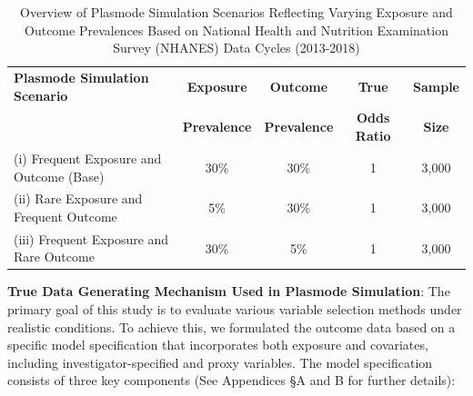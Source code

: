 \documentclass[sn-vancouver,Numbered,lineno,pdflatex]{sn-jnl}
\begin{document}
\begin{table}[ht]
\centering
\caption{Overview of Plasmode Simulation Scenarios Reflecting Varying Exposure and Outcome Prevalences Based on National Health and Nutrition Examination Survey (NHANES) Data Cycles (2013-2018)}
\label{table:scenarios}
\begin{tabular}{lcccc}
  \toprule
  \textbf{Plasmode Simulation Scenario} & \textbf{Exposure} & \textbf{Outcome} & \textbf{True} & \textbf{Sample}\\
  \textbf{} & \textbf{Prevalence} & \textbf{Prevalence} & \textbf{Odds Ratio} & \textbf{Size}\\
  \midrule
  (i) Frequent Exposure and Outcome (Base) & 30\% & 30\% & 1 & 3,000 \\
  (ii) Rare Exposure and Frequent Outcome & 5\% & 30\% & 1 & 3,000 \\
  (iii) Frequent Exposure and Rare Outcome & 30\% & 5\% & 1 & 3,000 \\
  \bottomrule
\end{tabular}
\end{table}

\textbf{True Data Generating Mechanism Used in Plasmode Simulation}: The
primary goal of this study is to evaluate various variable selection
methods under realistic conditions. To achieve this, we formulated the
outcome data based on a specific model specification that incorporates
both exposure and covariates, including investigator-specified and proxy
variables. The model specification consists of three key components (See
Appendices \S A and B for further details):
\end{document}
